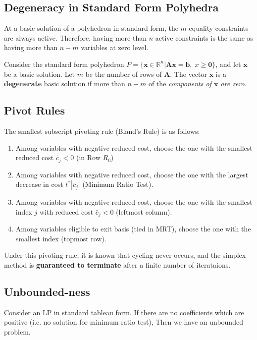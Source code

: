 \documentclass{article}
\begin{document}
\subsection{Degeneracy in Standard Form Polyhedra}

At a basic solution of a polyhedron in standard form, the $m$ equality constraints are always active. Therefore, having more than $n$ active constraints is the same as having more than $n-m$ variables at zero level. 

\begin{definition}
    Consider the standard form polyhedron $P = \{\mathbf{x} \in \mathbb{R}^{n} | \mathbf{Ax} = \mathbf{b}, \; x \geq \mathbf{0} \}$, and let $\mathbf{x}$ be a basic solution. Let $m$ be the number of rows of $\mathbf{A}$. The vector $\mathbf{x}$ is a \textbf{degenerate} basic solution if more than $n-m$ of the\textit{ components of $\mathbf{x}$ are zero}. 
\end{definition}

\subsection{Pivot Rules}
The smallest subscript pivoting rule (Bland's Rule) is as follows: 

\begin{theorem}
    
    \begin{enumerate}
        \item Among variables with negative reduced cost, choose the one with the smallest reduced cost $\bar{c}_j < 0$ (in Row $R_{0}$)
        \item Among variables with negative reduced cost, choose the one with the largest decrease in cost $t^{*} |\bar{c}_j|$ (Minimum Ratio Test). 
        \item Among variables with negative reduced cost, choose the one with the smallest index $j$ with reduced cost $\bar{c}_j < 0$ (leftmost column). 
        \item Among variables eligible to exit basis (tied in MRT), choose the one with the smallest index (topmost row).
    \end{enumerate}
    \noindent Under this pivoting rule, it is known that cycling never occurs, and the simplex method is \textbf{guaranteed to terminate} after a finite number of iterataions. 
\end{theorem}

\subsection{Unbounded-ness}
Consider an LP in standard tableau form. If there are no coefficients which are positive (i.e. no solution for minimum ratio test), Then we have an unbounded problem. 
\end{document}
